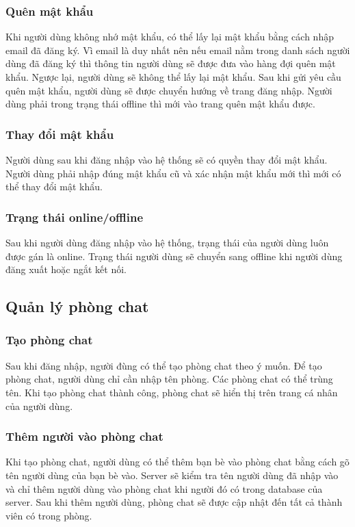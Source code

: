 \documentclass[a4paper]{article}
\begin{document}
		\subsubsection{Quên mật khẩu}
		Khi người dùng không nhớ mật khẩu, có thể lấy lại mật khẩu bằng cách nhập email đã đăng ký. Vì email là duy nhất nên nếu email nằm trong danh sách người dùng đã đăng ký thì thông tin người dùng sẽ được đưa vào hàng đợi quên mật khẩu. Ngược lại, người dùng sẽ không thể lấy lại mật khẩu.\linebreak
		Sau khi gửi yêu cầu quên mật khẩu, người dùng sẽ được chuyển hướng về trang đăng nhập.\linebreak
		Người dùng phải trong trạng thái offline thì mới vào trang quên mật khẩu được.
		
		\subsubsection{Thay đổi mật khẩu}
		Người dùng sau khi đăng nhập vào hệ thống sẽ có quyền thay đổi mật khẩu. Người dùng phải nhập đúng mật khẩu cũ và xác nhận mật khẩu mới thì mới có thể thay đổi mật khẩu.
		
		\subsubsection{Trạng thái online/offline}
		Sau khi người dùng đăng nhập vào hệ thống, trạng thái của người dùng luôn được gán là online.\linebreak
		Trạng thái người dùng sẽ chuyển sang offline khi người dùng đăng xuất hoặc ngắt kết nối.
		
	\subsection{Quản lý phòng chat}
		\subsubsection{Tạo phòng chat}
		Sau khi đăng nhập, người đùng có thể tạo phòng chat theo ý muốn. Để tạo phòng chat, người dùng chỉ cần nhập tên phòng. Các phòng chat có thể trùng tên.\linebreak
		Khi tạo phòng chat thành công, phòng chat sẽ hiển thị trên trang cá nhân của người dùng.
		
		\subsubsection{Thêm người vào phòng chat}
		Khi tạo phòng chat, người dùng có thể thêm bạn bè vào phòng chat bằng cách gõ tên người dùng của bạn bè vào.\linebreak
		Server sẽ kiểm tra tên người dùng đã nhập vào và chỉ thêm người dùng vào phòng chat khi người đó có trong database của server.\linebreak
		Sau khi thêm người dùng, phòng chat sẽ được cập nhật đến tất cả thành viên có trong phòng.
		
\end{document}
